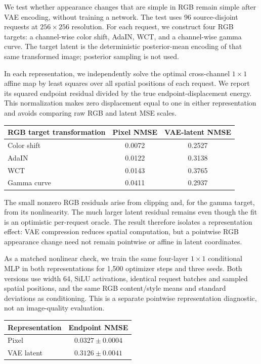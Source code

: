 \documentclass[letterpaper]{article}
\begin{document}
We test whether appearance changes that are simple in RGB remain simple after VAE
encoding, without training a network. The test uses 96 source-disjoint requests at
$256{\times}256$ resolution. For each request, we construct four RGB targets: a channel-wise
color shift, AdaIN, WCT, and a channel-wise gamma curve. The target latent is the
deterministic posterior-mean encoding of that same transformed image; posterior sampling is
not used.

In each representation, we independently solve the optimal cross-channel $1{\times}1$
affine map by least squares over all spatial positions of each request. We report its squared
endpoint residual divided by the true endpoint-displacement energy. This normalization makes
zero displacement equal to one in either representation and avoids comparing raw RGB and
latent MSE scales.

\begin{center}
\footnotesize
\setlength{\tabcolsep}{2pt}
\begin{tabular}{lcc}
\toprule
RGB target transformation & Pixel NMSE & VAE-latent NMSE \\
\midrule
Color shift & 0.0072 & 0.2527 \\
AdaIN & 0.0122 & 0.3138 \\
WCT & 0.0143 & 0.3765 \\
Gamma curve & 0.0411 & 0.2937 \\
\bottomrule
\end{tabular}
\end{center}

The small nonzero RGB residuals arise from clipping and, for the gamma target, from its
nonlinearity. The much larger latent residual remains even though the fit is an optimistic
per-request oracle. The result therefore isolates a representation effect: VAE compression
reduces spatial computation, but a pointwise RGB appearance change need not remain pointwise
or affine in latent coordinates.

As a matched nonlinear check, we train the same four-layer $1{\times}1$ conditional MLP in
both representations for 1,500 optimizer steps and three seeds. Both versions use width 64,
SiLU activations, identical request batches and sampled spatial positions, and the same RGB
content/style means and standard deviations as conditioning. This is a separate pointwise
representation diagnostic, not an image-quality evaluation.

\begin{center}
\footnotesize
\begin{tabular}{lc}
\toprule
Representation & Endpoint NMSE \\
\midrule
Pixel & $0.0327\pm0.0004$ \\
VAE latent & $0.3126\pm0.0041$ \\
\bottomrule
\end{tabular}
\end{center}
\end{document}
